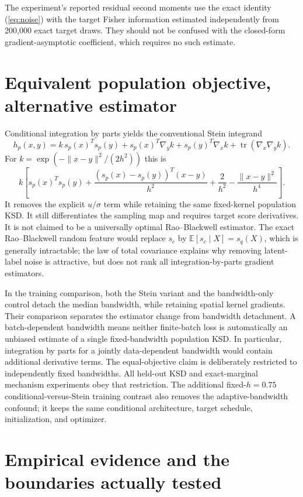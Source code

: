 \documentclass[11pt,a4paper]{article}
\numberwithin{equation}{section}
\newcommand{\E}{\mathbb E}
\newcommand{\tr}{\operatorname{tr}}
\begin{document}
The experiment's reported residual second moments use the exact identity
(\ref{eq:noise}) with the target Fisher information estimated independently
from 200,000 exact target draws. They should not be confused with the
closed-form gradient-asymptotic coefficient, which requires no such estimate.

\section{Equivalent population objective, alternative estimator}
Conditional integration by parts yields the conventional Stein integrand
\[
 h_p(x,y)=k\,s_p(x)^Ts_p(y)+s_p(x)^T\nabla_yk
         +s_p(y)^T\nabla_xk+\tr(\nabla_x\nabla_yk).
\]
For $k=\exp(-\|x-y\|^2/(2h^2))$ this is
\[
 k\left[s_p(x)^Ts_p(y)+
 \frac{(s_p(x)-s_p(y))^T(x-y)}{h^2}
 +\frac{2}{h^2}-\frac{\|x-y\|^2}{h^4}\right].
\]
It removes the explicit $u/\sigma$ term while retaining the same fixed-kernel
population KSD. It still differentiates the sampling map and requires target
score derivatives. It is not claimed to be a universally optimal
Rao--Blackwell estimator. The exact Rao--Blackwell random feature would
replace $s_c$ by $\E[s_c\mid X]=s_q(X)$, which is generally intractable;
the law of total covariance explains why removing latent-label noise is
attractive, but does not rank all integration-by-parts gradient estimators.

In the training comparison, both the Stein variant and the bandwidth-only
control detach the median bandwidth, while retaining spatial kernel
gradients. Their comparison separates the estimator change from bandwidth
detachment. A batch-dependent bandwidth means neither finite-batch loss is
automatically an unbiased estimate of a single fixed-bandwidth population
KSD. In particular, integration by parts for a jointly data-dependent
bandwidth would contain additional derivative terms. The equal-objective
claim is deliberately restricted to independently fixed bandwidths. All
held-out KSD and exact-marginal mechanism experiments obey that restriction.
The additional fixed-$h=0.75$ conditional-versus-Stein training contrast
also removes the adaptive-bandwidth confound; it keeps the same conditional
architecture, target schedule, initialization, and optimizer.

\section{Empirical evidence and the boundaries actually tested}
\end{document}
